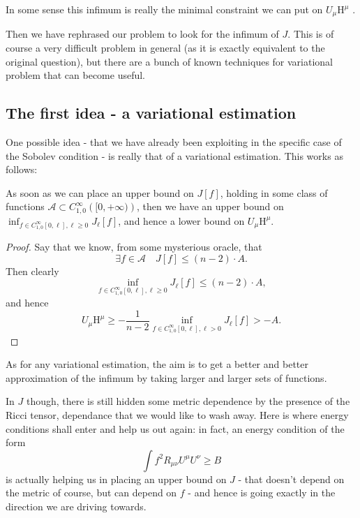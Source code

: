 In some sense this infimum is really the minimal constraint we can put on \(U_{\mu}\mathrm{H}^{\mu}\)
.

Then we have rephrased our problem to look for the infimum of \(J\).
This is of course a very difficult problem in general (as it is exactly equivalent to the original question), but there are a bunch of known techniques for variational problem that can become useful.

\subsection{The first idea - a variational estimation}
One possible idea - that we have already been exploiting in the specific case of the Sobolev condition - is really that of a variational estimation. This works as follows:
\begin{lemma}
	As soon as we can place an upper bound on \(J[f]\), holding in some class of functions \(\mathcal{A} \subset C^{\infty}_{1,0}\left([0,+\infty)\right)\), then we have an upper bound on \(\inf_{f\in C^{\infty}_{1,0}[0, \ell], \ell \ge 0}J_{\ell}[f]\), and hence a lower bound on \(U_{\mu}\mathrm{H}^{\mu}\).
\end{lemma}
	\begin{proof}
		Say that we know, from some mysterious oracle, that
		\[
		\exists f \in \mathcal{A} \quad J[f] \le (n-2) \cdot A.
		\]
		Then clearly
		\[
			\inf_{f\in C^{\infty}_{1,0}[0, \ell], \ell \ge 0}J_{\ell}[f] \le (n-2) \cdot A,
		\]
		and hence
		\[
			U_{\mu}\mathrm{H}^{\mu} \ge -\frac{1}{n - 2} \inf_{f\in C^{\infty}_{1,0}[0, \ell], \ell > 0}J_{\ell}[f] > - A.
		\]
	\end{proof}
	As for any variational estimation, the aim is to get a better and better approximation of the infimum by taking larger and larger sets of functions.

	In \(J\) though, there is still hidden some metric dependence by the presence of the Ricci tensor, dependance that we would like to wash away. Here is where energy conditions shall enter and help us out again: in fact, an energy condition of the form 
	\[
	\int f^2 R_{\mu\nu}U^{\mu}U^{\nu} \ge B	
	\]
	is actually helping us in placing an upper bound on \(J\) - that doesn't depend on the metric of course, but can depend on \(f\) - and hence is going exactly in the direction we are driving towards.

